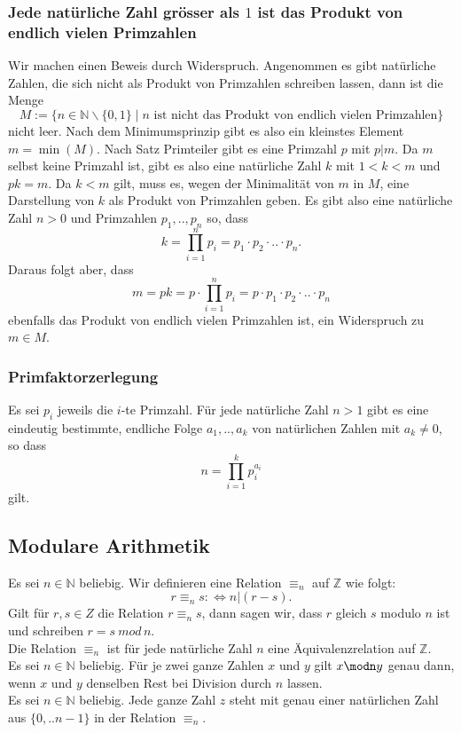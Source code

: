 \subsubsection{ Jede natürliche Zahl grösser als $1$ ist das Produkt von endlich vielen Primzahlen}
Wir machen einen Beweis durch Widerspruch. Angenommen es gibt natürliche Zahlen, die sich nicht als Produkt von Primzahlen schreiben lassen, dann ist die Menge
\[
 M:=\{n\in\mathbb{N}\backslash\{0,1\}\mid n\text{ ist nicht das Produkt von endlich vielen Primzahlen}\}
\]
nicht leer. Nach dem Minimumsprinzip gibt es also ein kleinstes Element $m=\min(M)$. Nach Satz Primteiler gibt es eine Primzahl $p$ mit $p|m$. Da $m$ selbst keine Primzahl ist, gibt es also eine natürliche Zahl $k$ mit $1<k<m$ und $pk=m$. Da $k<m$ gilt, muss es, wegen der Minimalität von $m$ in $M$, eine Darstellung von $k$ als Produkt von Primzahlen geben. Es gibt also eine natürliche Zahl $n>0$ und Primzahlen $p_1,..,p_n$ so, dass
\[
k=\prod_{i=1}^{n}p_i=p_1\cdot p_2\cdot..\cdot p_n.
\]
Daraus folgt aber, dass
\[
 m=pk=p\cdot\prod_{i=1}^{n}p_i=p\cdot p_1\cdot p_2\cdot..\cdot p_n
\]
ebenfalls das Produkt von endlich vielen Primzahlen ist, ein Widerspruch zu $m\in M$.

\subsubsection{Primfaktorzerlegung}
Es sei $p_i$ jeweils die $i$-te Primzahl. Für jede natürliche Zahl $n>1$ gibt es eine eindeutig bestimmte, endliche Folge $a_1,..,a_k$ von natürlichen Zahlen mit $a_k\neq 0$, so dass
\[
 n=\prod_{i=1}^k p_i^{a_i}
\]
gilt.

\subsection{Modulare Arithmetik}
Es sei $n\in\mathbb{N}$ beliebig. Wir definieren eine Relation $\equiv_n$ auf $\mathbb{Z}$ wie folgt:
\[
 r\equiv_n s:\Leftrightarrow n|(r-s).
\]
Gilt für $r,s\in Z$ die Relation $r\equiv_ns$, dann sagen wir, dass $r$ gleich $s$ modulo $n$ ist und schreiben $r=s \:mod\, n$.
\\
 Die Relation $\equiv_n$ ist für jede natürliche Zahl $n$ eine Äquivalenzrelation auf $\mathbb{Z}$.
\\
Es sei $n\in\mathbb{N}$ beliebig. Für je zwei ganze Zahlen $x$ und $y$ gilt $x\modn y$ genau dann, wenn $x$ und $y$ denselben Rest bei Division durch $n$ lassen.
\\
 Es sei $n\in\mathbb{N}$ beliebig. Jede ganze Zahl $z$ steht mit genau einer natürlichen Zahl aus $\{0,..n-1\}$ in der Relation $\equiv_n$.

